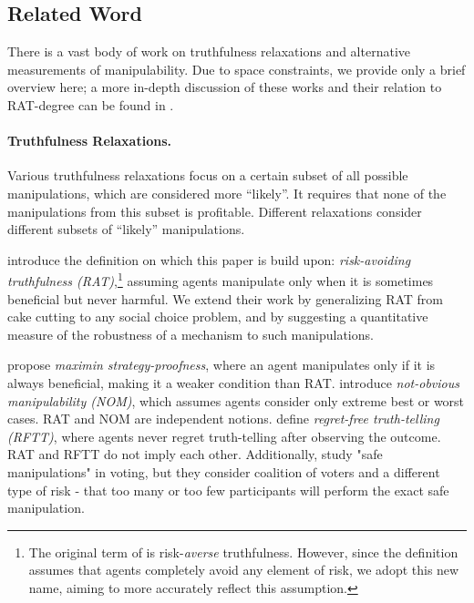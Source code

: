 \subsection{Related Word}
There is a vast body of work on truthfulness relaxations and alternative measurements of manipulability. Due to space constraints, we provide only a brief overview here; a more in-depth discussion of these works and their relation to RAT-degree can be found in .


\paragraph{Truthfulness Relaxations.} Various truthfulness relaxations focus on a certain subset of all possible manipulations, which are considered more ``likely''. It requires that none of the manipulations from this subset is profitable. Different relaxations consider different subsets of ``likely'' manipulations.

\citet{BU2023Rat} introduce the definition on which this paper is build upon: \emph{risk-avoiding truthfulness (RAT)},\footnote{The original term of \citet{BU2023Rat}  is risk-\emph{averse} truthfulness. However, since the definition assumes that agents completely avoid any element of risk, we adopt this new name, aiming to more accurately reflect this assumption.} assuming agents manipulate only when it is sometimes beneficial but never harmful. We extend their work by generalizing RAT from cake cutting to any social choice problem, and by suggesting a quantitative measure of the robustness of a mechanism to such manipulations.

\citet{brams2006better} propose \emph{maximin strategy-proofness}, where an agent manipulates only if it is always beneficial, making it a weaker condition than RAT. 
\citet{troyan2020obvious} introduce \emph{not-obvious manipulability (NOM)}, which assumes agents consider only extreme best or worst cases. RAT and NOM are independent notions. \citet{regret2018Fernandez} define \emph{regret-free truth-telling (RFTT)}, where agents never regret truth-telling after observing the outcome. RAT and RFTT do not imply each other. Additionally, \citet{slinko2008nondictatorial,slinko2014ever,hazon2010complexity} study "safe manipulations" in voting, but they consider coalition of voters and a different type of risk - that too many or too few participants will perform the exact safe manipulation.


